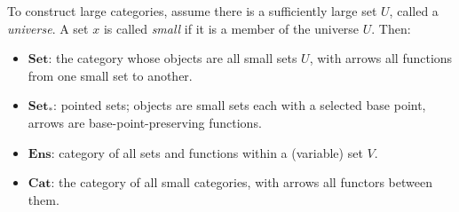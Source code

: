 To construct large categories, assume there is a sufficiently large set $U$, called a \emph{universe}. A set $x$ is called \emph{small} if it is a member of the universe $U$. Then:
\begin{itemize}
\item $\mathbf{Set}$: the category whose objects are all small sets $U$, with arrows all functions from one small set to another.
\item $\mathbf{Set}_*$: pointed sets; objects are small sets each with a selected base point, arrows are base-point-preserving functions.
\item $\mathbf{Ens}$: category of all sets and functions within a (variable) set $V$.
\item $\mathbf{Cat}$: the category of all small categories, with arrows all functors between them.
\end{itemize}
